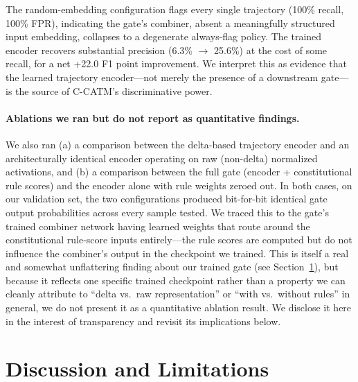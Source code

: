 \documentclass[11pt]{article}
\begin{document}
The random-embedding configuration flags every single trajectory (100\% recall, 100\% FPR), indicating the gate's combiner, absent a meaningfully structured input embedding, collapses to a degenerate always-flag policy. The trained encoder recovers substantial precision (6.3\% $\to$ 25.6\%) at the cost of some recall, for a net +22.0 F1 point improvement. We interpret this as evidence that the learned trajectory encoder---not merely the presence of a downstream gate---is the source of C-CATM's discriminative power.

\paragraph{Ablations we ran but do not report as quantitative findings.} We also ran (a) a comparison between the delta-based trajectory encoder and an architecturally identical encoder operating on raw (non-delta) normalized activations, and (b) a comparison between the full gate (encoder + constitutional rule scores) and the encoder alone with rule weights zeroed out. In both cases, on our validation set, the two configurations produced bit-for-bit identical gate output probabilities across every sample tested. We traced this to the gate's trained combiner network having learned weights that route around the constitutional rule-score inputs entirely---the rule scores are computed but do not influence the combiner's output in the checkpoint we trained. This is itself a real and somewhat unflattering finding about our trained gate (see Section~\ref{sec:limitations}), but because it reflects one specific trained checkpoint rather than a property we can cleanly attribute to ``delta vs.\ raw representation'' or ``with vs.\ without rules'' in general, we do not present it as a quantitative ablation result. We disclose it here in the interest of transparency and revisit its implications below.

\section{Discussion and Limitations}
\label{sec:limitations}
\end{document}

